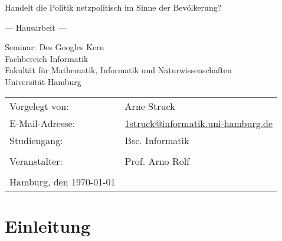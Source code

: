 \documentclass[
	12pt,
	a4paper,
	BCOR10mm,
	DIV14,
	listof=totoc,
	bibliography=totoc,
	headsepline
]{scrreprt}
\begin{document}
\begin{titlepage}
	\begin{center}
		{\titlefont\huge Handelt die Politik netzpolitisch im Sinne der Bevölkerung? \par}

		\bigskip
		\bigskip

		{\titlefont\Large --- Hausarbeit ---\par}

		\bigskip
		\bigskip

		{\large Seminar: Des Googles Kern\\
		Fachbereich Informatik\\
		Fakultät für Mathematik, Informatik und Naturwissenschaften\\
		Universität Hamburg\par}
	\end{center}

	\vfill

	{\large \begin{tabular}{ll}
		Vorgelegt von: & Arne Struck \\
		E-Mail-Adresse: 
			& \href{mailto:1struck@informatik.uni-hamburg.de}{1struck@informatik.uni-hamburg.de} \\ 
		Studiengang: & Bsc. Informatik \\
		\\
		Veranstalter: & Prof. Arno Rolf\\
		\\
		Hamburg, den \today
	\end{tabular}\par}
\end{titlepage}

\thispagestyle{empty}

\newpage\null\thispagestyle{empty}\newpage
\tableofcontents
\newpage\null\thispagestyle{empty}\newpage

\chapter{Einleitung}
\label{intro}
\end{document}
